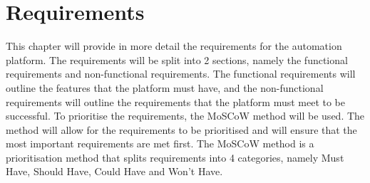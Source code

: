 \chapter{Requirements}
\label{chap:requirements}
This chapter will provide in more detail the requirements for the automation
platform. The requirements will be split into 2 sections, namely the functional
requirements and non-functional requirements. The functional requirements
will outline the features that the platform must have, and the non-functional
requirements will outline the requirements that the platform must meet to be successful.
To prioritise the requirements, the MoSCoW method will be used. The method will allow for the requirements to be prioritised and will ensure that
the most important requirements are met first. The MoSCoW method is a
prioritisation method that splits requirements into 4 categories, namely Must
Have, Should Have, Could Have and Won’t Have.
